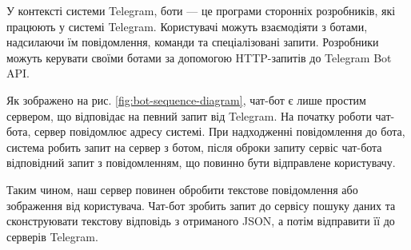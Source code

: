 У контексті системи Telegram, боти — це програми сторонніх розробників,
які працюють у системі Telegram.
Користувачі можуть взаємодіяти з ботами, надсилаючи їм повідомлення,
команди та спеціалізовані запити.
Розробники можуть керувати своїми ботами за допомогою HTTP-запитів до Telegram Bot API.

Як зображено на рис. \ref{fig:bot-sequence-diagram}, чат-бот є лише простим сервером, що відповідає на певний запит від Telegram.
На початку роботи чат-бота, сервер повідомлює адресу системі.
При надходженні повідомлення до бота, система робить запит на сервер з ботом,
після оброки запиту сервіс чат-бота відповідний запит з повідомленням, що повинно бути
відправлене користувачу.

Таким чином, наш сервер повинен обробити текстове повідомлення або зображення від користувача.
Чат-бот зробить запит до сервісу пошуку даних та сконструювати
текстову відповідь з отриманого JSON, а потім відправити її до серверів Telegram.
